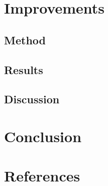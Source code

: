 \documentclass{article}
\begin{document}
\section{Improvements}

\subsection{Method}

\subsection{Results}

\subsection{Discussion}



\section{Conclusion}



\section{References}
\end{document}
